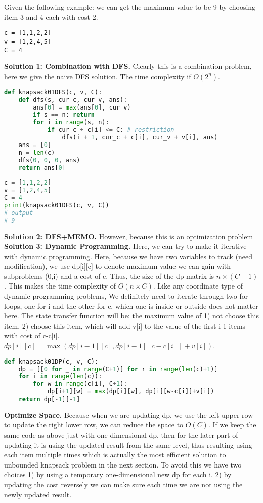 \documentclass[../main.tex]{subfiles}
\begin{document}
Given the following example: we can get the maximum value to be 9 by choosing item 3 and 4 each with cost 2. 
\begin{lstlisting}[numbers=none]
c = [1,1,2,2]
v = [1,2,4,5]
C = 4
\end{lstlisting}
\textbf{Solution 1: Combination with DFS.} Clearly this is a combination problem, here we give the naive DFS solution. The time complexity if $O(2^n)$.
\begin{lstlisting}[language=Python]
def knapsack01DFS(c, v, C):
    def dfs(s, cur_c, cur_v, ans):
        ans[0] = max(ans[0], cur_v)
        if s == n: return
        for i in range(s, n):
            if cur_c + c[i] <= C: # restriction
                dfs(i + 1, cur_c + c[i], cur_v + v[i], ans)
    ans = [0]
    n = len(c)
    dfs(0, 0, 0, ans)
    return ans[0]
    
c = [1,1,2,2]
v = [1,2,4,5]
C = 4
print(knapsack01DFS(c, v, C))
# output
# 9
\end{lstlisting}
\textbf{Solution 2: DFS+MEMO.} However, because this is an optimization problem 
\textbf{Solution 3: Dynamic Programming.} Here, we can try to make it iterative with dynamic programming. Here, because we have two variables to track (need modification), we use dp[i][c] to denote maximum value we can gain with subproblems (0,i) and a cost of c. Thus, the size of the dp matrix is $n\times (C+1)$. This makes the time complexity of $O(n\times C)$. Like any coordinate type of dynamic programming problems, We definitely need to iterate through two for loops, one for i and the other for c, which one is inside or outside does not matter here. The state transfer function will be: the maximum value of 1) not choose this item, 2) choose this item, which will add v[i] to the value of the first i-1 items with cost of c-c[i].  $dp[i][c] = \max(dp[i-1][c] , dp[i-1][c-c[i]]+v[i])$. 
\begin{lstlisting}[language=Python]
def knapsack01DP(c, v, C):
    dp = [[0 for _ in range(C+1)] for r in range(len(c)+1)]
    for i in range(len(c)):
        for w in range(c[i], C+1):
            dp[i+1][w] = max(dp[i][w], dp[i][w-c[i]]+v[i])
    return dp[-1][-1]
\end{lstlisting}
\textbf{Optimize Space.} Because when we are updating dp, we use the left upper row  to update the right lower row, we can reduce the space to $O(C)$. If we keep the same code as above just with one dimensional dp, then for the later part of updating it is using the updated result from the same level, thus resulting using each item multiple times which is actually the most efficient solution to unbounded knapsack problem in the next section. To avoid this we have two choices 1) by using a temporary one-dimensional new dp for each i. 2) by updating the cost reversely we can make sure each time we are not using the newly updated result. 
\end{document}
